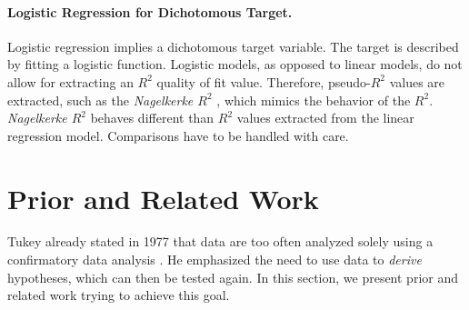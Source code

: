 \documentclass[journal]{style/vgtc} 			          %
\begin{document}
\paragraph{Logistic Regression for Dichotomous Target.} Logistic regression implies a dichotomous target variable.
The target is described by fitting a logistic function.
Logistic models, as opposed to linear models, do not allow for extracting an $R^2$ quality of fit value.
Therefore, pseudo-$R^2$ values are extracted, such as the \emph{Nagelkerke $R^2$} \cite{Nagelkerke}, which mimics the behavior of the $R^2$.
\emph{Nagelkerke $R^2$} behaves different than $R^2$ values extracted from the linear regression model.
Comparisons have to be handled with care.
\section{Prior and Related Work}
Tukey already stated in 1977 that data are too often analyzed solely using a confirmatory data analysis \cite{Tukey}.
He emphasized the need to use data to \emph{derive} hypotheses, which can then be tested again.
In this section, we present prior and related work trying to achieve this goal.
\end{document}
